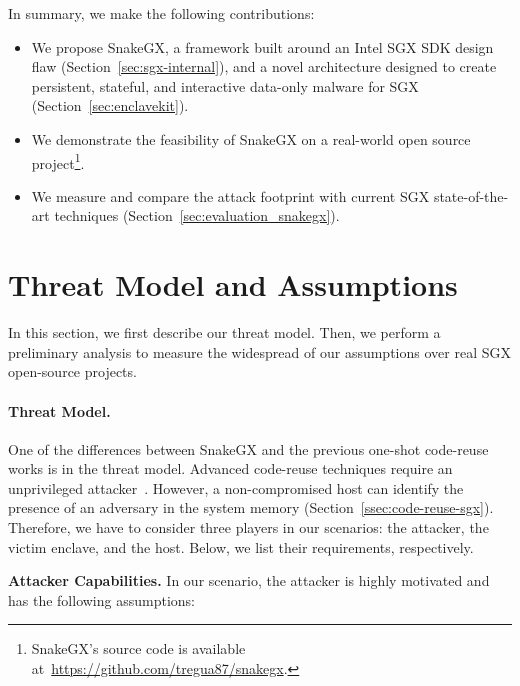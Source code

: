 In summary, we make the following contributions:
\begin{itemize}
	\item We propose SnakeGX, a framework built around an Intel SGX 
	SDK design flaw (Section~\ref{sec:sgx-internal}), and a novel architecture
	designed to create persistent, stateful, and interactive data-only
	malware for SGX (Section~\ref{sec:enclavekit}).
	\item We demonstrate the feasibility of SnakeGX on a real-world
	open source project\footnote{SnakeGX's source code is available 
		at~\url{https://github.com/tregua87/snakegx}.}.
	\item We measure and compare the attack footprint with current SGX 
	state-of-the-art techniques (Section~\ref{sec:evaluation_snakegx}).
\end{itemize}


\section{Threat Model and Assumptions}
\label{sec:threat-model_snakegx}

In this section, we first describe our threat model.
Then, we perform a preliminary analysis to measure the widespread of our 
assumptions over real SGX open-source projects.

\paragraph{\textbf{Threat Model.}}
One of the differences between SnakeGX and the previous one-shot code-reuse 
works is in the threat model.
Advanced code-reuse techniques require an unprivileged 
attacker~\cite{biondo2018guard}.
However, a non-compromised host can identify the presence of an adversary
in the system memory (Section~\ref{ssec:code-reuse-sgx}).
Therefore, we have to consider three players in our scenarios: the attacker, 
the victim enclave, and the host.
Below, we list their requirements, respectively.


\textbf{Attacker Capabilities.}
In our scenario, the attacker is highly motivated and has the following 
assumptions:

